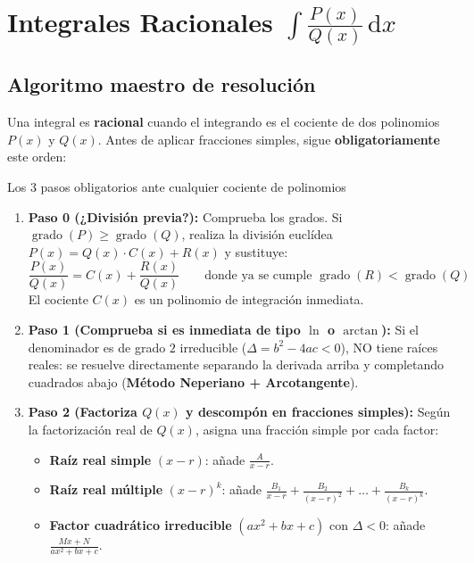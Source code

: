 \documentclass[10pt,a4paper]{article}
\newcommand{\minspace}[1]{\par\ifdim\dimexpr\pagegoal-\pagetotal\relax<#1\newpage\fi}
\begin{document}
\minspace{6.5cm}

\section[Integrales Racionales]{Integrales Racionales \texorpdfstring{$\displaystyle \int \frac{P(x)}{Q(x)}\,\mathrm{d}x$}{P(x)/Q(x)}}

\subsection{Algoritmo maestro de resolución}

Una integral es \textbf{racional} cuando el integrando es el cociente de dos polinomios $P(x)$ y $Q(x)$. Antes de aplicar fracciones simples, sigue \textbf{obligatoriamente} este orden:

\begin{formulabox}{Los 3 pasos obligatorios ante cualquier cociente de polinomios}
\begin{enumerate}\itemsep 2pt
  \item \textbf{Paso 0 (¿División previa?):} Comprueba los grados. Si $\operatorname{grado}(P) \ge \operatorname{grado}(Q)$, realiza la división euclídea $P(x) = Q(x)\cdot C(x) + R(x)$ y sustituye:
  $$\frac{P(x)}{Q(x)} = C(x) + \frac{R(x)}{Q(x)} \qquad \text{donde ya se cumple } \operatorname{grado}(R) < \operatorname{grado}(Q)$$
  El cociente $C(x)$ es un polinomio de integración inmediata.

  \item \textbf{Paso 1 (Comprueba si es inmediata de tipo $\ln$ o $\arctan$):} Si el denominador es de grado $2$ irreducible ($\Delta = b^2 - 4ac < 0$), NO tiene raíces reales: se resuelve directamente separando la derivada arriba y completando cuadrados abajo (\textbf{Método Neperiano + Arcotangente}).

  \item \textbf{Paso 2 (Factoriza $Q(x)$ y descompón en fracciones simples):} Según la factorización real de $Q(x)$, asigna una fracción simple por cada factor:
  \begin{itemize}\itemsep 1.5pt
    \item \textbf{Raíz real simple} $(x - r)$: añade $\displaystyle \frac{A}{x - r}$.
    \item \textbf{Raíz real múltiple} $(x - r)^k$: añade $\displaystyle \frac{B_1}{x - r} + \frac{B_2}{(x - r)^2} + \dots + \frac{B_k}{(x - r)^k}$.
    \item \textbf{Factor cuadrático irreducible} $(ax^2 + bx + c)$ con $\Delta < 0$: añade $\displaystyle \frac{Mx + N}{ax^2 + bx + c}$.
  \end{itemize}
\end{enumerate}
\end{formulabox}
\end{document}
